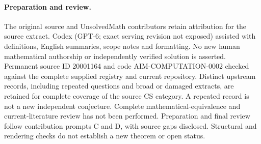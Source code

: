 \documentclass[11pt]{article}
\begin{document}
\paragraph{Preparation and review.}
The original source and UnsolvedMath contributors retain attribution for the source extract. Codex (GPT-6; exact serving revision not exposed) assisted with definitions, English summaries, scope notes and formatting. No new human mathematical authorship or independently verified solution is asserted. Permanent source ID 20001164 and code AIM-COMPUTATION-0002 checked against the complete supplied registry and current repository. Distinct upstream records, including repeated questions and broad or damaged extracts, are retained for complete coverage of the source CS category. A repeated record is not a new independent conjecture. Complete mathematical-equivalence and current-literature review has not been performed. Preparation and final review follow contribution prompts C and D, with source gaps disclosed. Structural and rendering checks do not establish a new theorem or open status.
\label{end:20001164}
\end{document}
